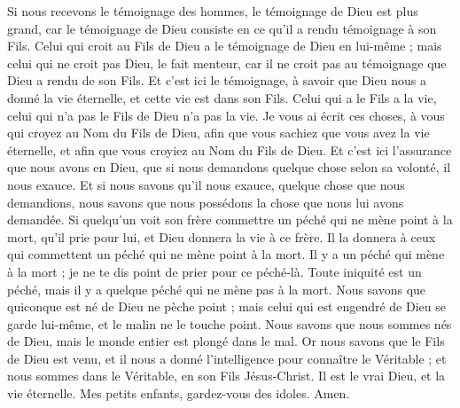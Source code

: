 \begin{multicols}{2}
Si nous recevons le témoignage des hommes, le témoignage de Dieu est plus grand, car le témoignage de Dieu consiste en ce qu’il a rendu témoignage à son Fils.
Celui qui croit au Fils de Dieu a le témoignage de Dieu en lui-même ; mais celui qui ne croit pas Dieu, le fait menteur, car il ne croit pas au témoignage que Dieu a rendu de son Fils.
Et c'est ici le témoignage, à savoir que Dieu nous a donné la vie éternelle, et cette vie est dans son Fils.
Celui qui a le Fils a la vie, celui qui n'a pas le Fils de Dieu n'a pas la vie.
Je vous ai écrit ces choses, à vous qui croyez au Nom du Fils de Dieu, afin que vous sachiez que vous avez la vie éternelle, et afin que vous croyiez au Nom du Fils de Dieu.
Et c'est ici l’assurance que nous avons en Dieu, que si nous demandons quelque chose selon sa volonté, il nous exauce.
Et si nous savons qu'il nous exauce, quelque chose que nous demandions, nous savons que nous possédons la chose que nous lui avons demandée.
Si quelqu'un voit son frère commettre un péché qui ne mène point à la mort{}, qu’il prie pour lui, et Dieu donnera la vie à ce frère. Il la donnera à ceux qui commettent un péché qui ne mène point à la mort. Il y a un péché qui mène à la mort ; je ne te dis point de prier pour ce péché-là.
Toute iniquité est un péché, mais il y a quelque péché qui ne mène pas à la mort.
Nous savons que quiconque est né de Dieu ne pèche point ; mais celui qui est engendré de Dieu se garde lui-même, et le malin ne le touche point.
Nous savons que nous sommes nés de Dieu, mais le monde entier est plongé dans le mal.
\TextTitle{[Conclusion]}
Or nous savons que le Fils de Dieu est venu, et il nous a donné l'intelligence pour connaître le Véritable ; et nous sommes dans le Véritable, en son Fils Jésus-Christ. Il est le vrai{} Dieu, et la vie éternelle.
Mes petits enfants, gardez-vous des idoles. Amen.
\PPE{}
\end{multicols}
